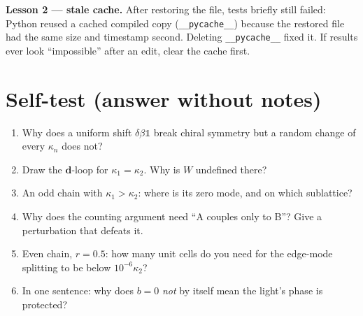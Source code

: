 \documentclass[10pt,a4paper]{article}
\newcommand{\ka}{\kappa_1}
\newcommand{\kc}{\kappa_2}
\begin{document}
\textbf{Lesson 2 --- stale cache.} After restoring the file, tests briefly still failed: Python reused a cached compiled copy (\texttt{\_\_pycache\_\_}) because the restored file had the same size and timestamp second. Deleting \texttt{\_\_pycache\_\_} fixed it. If results ever look ``impossible'' after an edit, clear the cache first.

\section{Self-test (answer without notes)}
\begin{enumerate}[itemsep=1pt]
\item Why does a uniform shift $\delta\beta\mathbb1$ break chiral symmetry but a random change of every $\kappa_n$ does not?
\item Draw the $\bm d$-loop for $\ka=\kc$. Why is $W$ undefined there?
\item An odd chain with $\ka>\kc$: where is its zero mode, and on which sublattice?
\item Why does the counting argument need ``A couples only to B''? Give a perturbation that defeats it.
\item Even chain, $r=0.5$: how many unit cells do you need for the edge-mode splitting to be below $10^{-6}\kc$?
\item In one sentence: why does $b=0$ \emph{not} by itself mean the light's phase is protected?
\end{enumerate}
\end{document}
